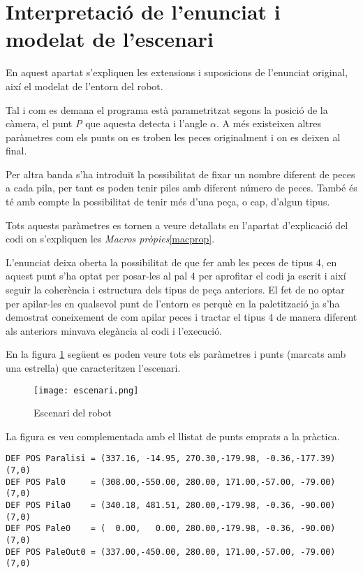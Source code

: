 \section{Interpretació de l'enunciat i modelat de l'escenari}
En aquest apartat s'expliquen les extensions i suposicions de l'enunciat original,
així el modelat de l'entorn del robot.

Tal i com es demana el programa està parametritzat segons la posició de la càmera,
el punt \emph{P} que aquesta detecta i l'angle $\alpha$. A més existeixen altres paràmetres
com els punts on es troben les peces originalment i on es deixen al final.

Per altra banda s'ha introduït la possibilitat de fixar un nombre diferent de peces
a cada pila, per tant es poden tenir piles amb diferent número de peces. També
és té amb compte la possibilitat de tenir més d'una peça, o cap, d'algun tipus.

Tots aquests paràmetres es tornen a veure detallats en l'apartat d'explicació del
codi on s'expliquen les \emph{Macros pròpies}\ref{macprop}.

L'enunciat deixa oberta la possibilitat de que fer amb les peces de
tipus 4, en aquest punt s'ha optat per posar-les al pal 4 per aprofitar el codi ja escrit i
així seguir la coherència i estructura dels tipus de peça anteriors. El fet de
no optar per apilar-les en qualsevol punt de l'entorn es perquè en la paletització
ja s'ha demostrat coneixement de com apilar peces i tractar el tipus 4 de manera
diferent als anteriors minvava elegància al codi i l'execució.

En la figura \ref{figescenari} següent es poden veure tots els paràmetres i punts
(marcats amb una estrella) que caracteritzen l'escenari.

\begin{figure}[H]
\begin{center}\label{figescenari}
 \texttt{[image: escenari.png]}
\end{center}
  \caption{Escenari del robot}
\end{figure}

La figura es veu complementada amb el llistat de punts emprats a la pràctica.

\begin{verbatim}
DEF POS Paralisi = (337.16, -14.95, 270.30,-179.98, -0.36,-177.39)(7,0)
DEF POS Pal0     = (308.00,-550.00, 280.00, 171.00,-57.00, -79.00)(7,0)
DEF POS Pila0    = (340.18, 481.51, 280.00,-179.98, -0.36, -90.00)(7,0)
DEF POS Pale0    = (  0.00,   0.00, 280.00,-179.98, -0.36, -90.00)(7,0)
DEF POS PaleOut0 = (337.00,-450.00, 280.00, 171.00,-57.00, -79.00)(7,0)
\end{verbatim}

